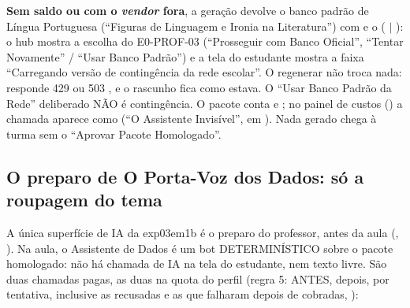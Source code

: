 \textbf{Sem saldo ou com o \emph{vendor} fora}, a geração devolve o banco
padrão de Língua Portuguesa (\enquote{Figuras de Linguagem e Ironia na
Literatura}) com  e o  (
$|$ ): o hub mostra a escolha do E0-PROF-03
(\enquote{Prosseguir com Banco Oficial}, \enquote{Tentar Novamente} /
\enquote{Usar Banco Padrão}) e a tela do estudante mostra a faixa
\enquote{Carregando versão de contingência da rede escolar}. O regenerar não
troca nada: responde 429  ou 503 , e o
rascunho fica como estava. O \enquote{Usar Banco Padrão da Rede} deliberado
NÃO é contingência. O pacote conta  e ; no
painel de custos () a chamada aparece como
 (\enquote{O Assistente Invisível}, em
). Nada gerado chega à turma sem o \enquote{Aprovar
Pacote Homologado}.

\subsection{O preparo de O Porta-Voz dos Dados: só a roupagem do tema}
\label{sec:ia-preparo-exp03em1b}

A única superfície de IA da exp03em1b é o preparo do professor, antes da aula
(, ). Na
aula, o Assistente de Dados é um bot DETERMINÍSTICO sobre o pacote
homologado: não há chamada de IA na tela do estudante, nem texto livre. São
duas chamadas pagas, as duas na quota do perfil  (regra 5:
 ANTES,  depois, por tentativa, inclusive as
recusadas e as que falharam depois de cobradas, ):

